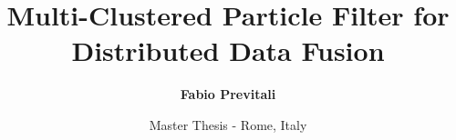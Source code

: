 \documentclass{beamer}
\title[Multi-Clustered PF for DDF]{Multi-Clustered Particle Filter for Distributed Data Fusion}
\subtitle{}
\author[Fabio Previtali]{\textbf{Fabio Previtali}}
\date[19/07/2011]{Master Thesis - Rome, Italy}
\begin{document}
\begin{frame}[plain]
	\titlepage
\end{frame}





\end{document}
